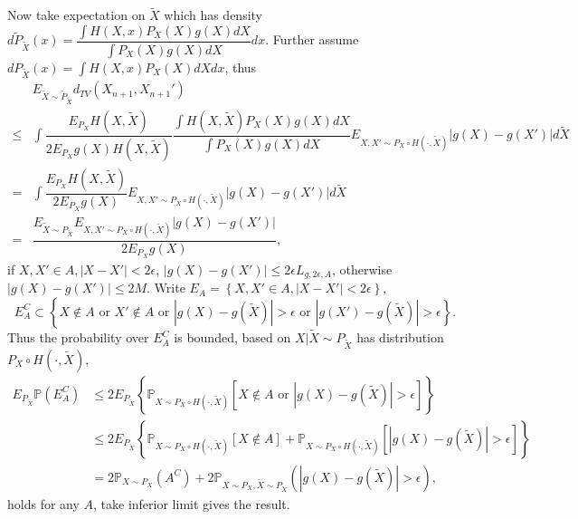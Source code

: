 \documentclass[12pt, a4paper, oneside]{article}
\begin{document}
    Now take expectation on $\tilde{X}$ which has density $d\tilde{P}_{\tilde{X}}(x)=\dfrac{\int H(X,x)P_X(X)g(X)dX}{\int P_X(X)g(X)dX}dx$. Further assume $dP_{\tilde{X}}(x)=\int H(X,x)P_X(X)dXdx$, thus
    \begin{align*}
        &E_{\tilde{X}\sim\tilde{P}_{\tilde{X}}}d_{TV}(X_{n+1},X_{n+1}')\\
        \leq&\int \dfrac{E_{P_X}H(X,\tilde{X})}{2E_{P_X}g(X)H(X,\tilde{X})}\dfrac{\int H(X,\tilde{X})P_X(X)g(X)dX}{\int P_X(X)g(X)dX}E_{X,X'\sim P_X\circ H(\cdot,\tilde{X})}\Big|g(X)-g(X')\Big|d\tilde{X}\\
        =&\int\dfrac{E_{P_X}H(X,\tilde{X})}{2E_{P_X}g(X)}E_{X,X'\sim P_X\circ H(\cdot,\tilde{X})}\Big|g(X)-g(X')\Big|d\tilde{X}\\
        =&\dfrac{E_{\tilde{X}\sim P_{\tilde{X}}}E_{X,X'\sim P_X\circ H(\cdot,\tilde{X})}\Big|g(X)-g(X')\Big|}{2E_{P_X}g(X)},
    \end{align*}
    if $X,X'\in A,|X-X'|<2\epsilon$, $|g(X)-g(X')|\leq 2\epsilon L_{g,2\epsilon,A}$, otherwise $|g(X)-g(X')|\leq 2M$. Write $E_A=\left\{ X,X'\in A,|X-X'|<2\epsilon \right\}$,
    \begin{equation*}
        E_A^C\subset \left\{ X\notin A\text{ or }X'\notin A\text{ or }|g(X)-g(\tilde{X})|>\epsilon\text{ or }|g(X')-g(\tilde{X})|>\epsilon \right\}.
    \end{equation*}
    Thus the probability over $E_A^C$ is bounded, based on $X|\tilde{X}\sim P_{\tilde{X}}$ has distribution $P_X\circ H(\cdot,\tilde{X})$,
    \begin{align*}
        E_{P_{\tilde{X}}}\mathbb{P}(E_A^C)&\leq 2E_{P_{\tilde{X}}}\left\{ \mathbb{P}_{X\sim P_X\circ H(\cdot,\tilde{X})}\left[ X\notin A\text{ or }|g(X)-g(\tilde{X})|>\epsilon \right] \right\}\\
        &\leq 2E_{P_{\tilde{X}}}\left\{ \mathbb{P}_{X\sim P_X\circ H(\cdot,\tilde{X})}\left[ X\notin A\right]+\mathbb{P}_{X\sim P_X\circ H(\cdot,\tilde{X})}\left[ |g(X)-g(\tilde{X})|>\epsilon \right] \right\}\\
        &=2\mathbb{P}_{X\sim P_X}(A^C)+2\mathbb{P}_{X\sim P_X,\tilde{X}\sim P_{\tilde{X}}}\left( |g(X)-g(\tilde{X})|>\epsilon \right),
    \end{align*}
    holds for any $A$, take inferior limit gives the result. 
\end{document}
